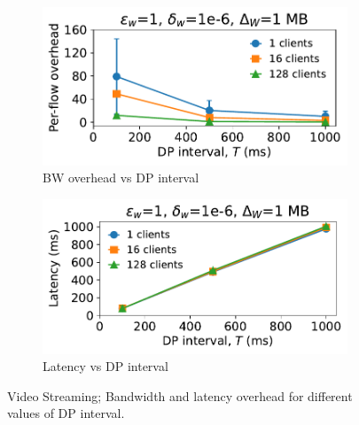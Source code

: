 \begin{figure}[t]
  \centering
  \begin{subfigure}{0.49\columnwidth}
      \centering
      \includegraphics[width=\textwidth]{plots/overhead_vs_dp_interval_video.pdf}
      \caption{BW overhead vs DP interval}
      \label{fig:video-overhead-vs-dpInt}
  \end{subfigure}
  \hfill
  \begin{subfigure}{0.49\columnwidth}
      \centering
      \includegraphics[width=\textwidth]{plots/latency_vs_dp_interval_video.pdf}
      \caption{Latency vs DP interval}
      \label{fig:video-latency-vs-dpInt}
  \end{subfigure}
  \caption{Video Streaming; Bandwidth and latency overhead for different values of DP interval.
  }
\end{figure}


